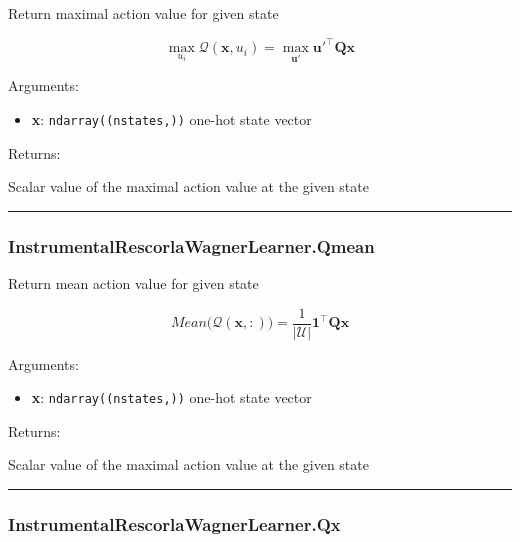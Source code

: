 Return maximal action value for given state

\[
\max_{u_i}\mathcal Q(\mathbf x, u_i) = \max_{\mathbf u'} \mathbf u'^\top \mathbf Q \mathbf x
\]

Arguments:

\begin{itemize}
\tightlist
\item
  \textbf{x}: \texttt{ndarray((nstates,))} one-hot state vector
\end{itemize}

Returns:

Scalar value of the maximal action value at the given state

\begin{center}\rule{0.5\linewidth}{\linethickness}\end{center}

\hypertarget{instrumentalrescorlawagnerlearner.qmean}{%
\subsubsection{InstrumentalRescorlaWagnerLearner.Qmean}\label{instrumentalrescorlawagnerlearner.qmean}}

\begin{Shaded}
\begin{Highlighting}[]
\end{Highlighting}
\end{Shaded}

Return mean action value for given state

\[
Mean \big(\mathcal Q(\mathbf x, :)\big) = \frac{1}{|\mathcal U|} \mathbf 1^\top \mathbf Q \mathbf x
\]

Arguments:

\begin{itemize}
\tightlist
\item
  \textbf{x}: \texttt{ndarray((nstates,))} one-hot state vector
\end{itemize}

Returns:

Scalar value of the maximal action value at the given state

\begin{center}\rule{0.5\linewidth}{\linethickness}\end{center}

\hypertarget{instrumentalrescorlawagnerlearner.qx}{%
\subsubsection{InstrumentalRescorlaWagnerLearner.Qx}\label{instrumentalrescorlawagnerlearner.qx}}

